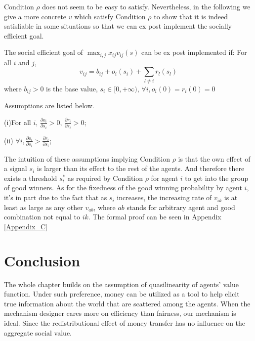 Condition $\rho$ does not seem to be easy to satisfy. Nevertheless, in
the following we give a more concrete $v$ which satisfy Condition
$\rho$ to show that it is indeed satisfiable in some situations so
that we can ex post implement the socially efficient goal.
\begin{prop}
  \label{rho}
  The social efficient goal of $\max_{i,j}x_{ij}v_{ij}(s)$ can be ex post implemented if:
For all $i$ and $j$,
$$v_{ij}=b_{ij} + o_i(s_i) + \sum_{l \not = i} r_l(s_l) $$
where $b_{ij}>0$ is the base value, $s_i \in [0, + \infty)$, $\forall i,o_i(0)=r_i(0)=0$

Assumptions are listed below.

(i)For all $i$, $\frac{\partial o_i}{\partial s_i} > 0$, $\frac{\partial r_i}{\partial s_i} > 0$;

(ii) $\forall i, \frac{\partial o_i}{\partial s_i}
> \frac{\partial r_i}{\partial s_i}$;

\end{prop}


The intuition of these assumptions implying Condition $\rho$ is that
the own effect of a signal $s_i$ is larger than its effect to the rest
of the agents. And therefore there exists a threshold $s_i^*$ as
required by Condition $\rho$ for agent $i$ to get into the group of
good winners. As for the fixedness of the good winning probability by agent $i$,
it's in part due to the fact that as $s_i$ increases, the increasing
rate of $v_{ik}$ is at least as large as any other $v_{ab}$, where
$ab$ stands for arbitrary agent and good combination not equal to
$ik$. The formal proof can be seen in Appendix \ref{Appendix_C}







\section{Conclusion}

The whole chapter builds on the assumption of quasilinearity of agents' value function. Under such preference,  money can be utilized 
as a tool to help elicit true information about the world that are scattered among the agents.
When the mechanism designer cares more on efficiency than fairness, our mechanism is ideal. Since the redistributional effect of money 
transfer has no influence on the aggregate social value.






